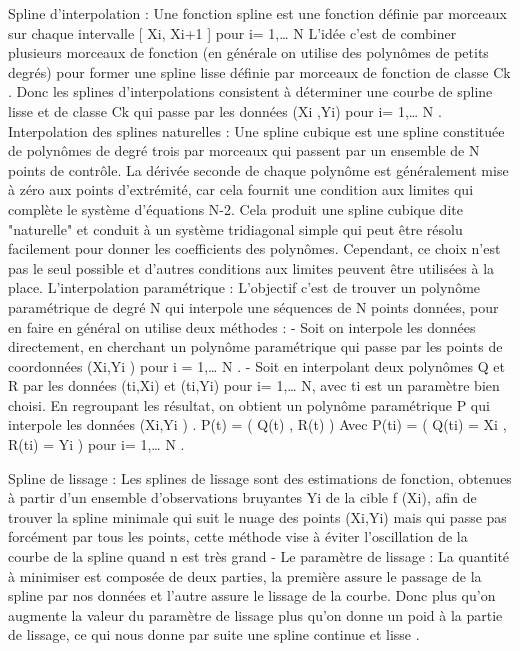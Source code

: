 \documentclass[a4paper,10pt]{article} %
\begin{document}
Spline d’interpolation :
            Une fonction spline est une fonction  définie par morceaux sur chaque intervalle          [ Xi, Xi+1 ]  pour  i= 1,… N
            L’idée c’est de combiner plusieurs morceaux de fonction (en générale on utilise des polynômes de petits degrés) pour former une spline lisse définie par morceaux de fonction de classe Ck . Donc les splines d’interpolations consistent à déterminer une courbe de spline lisse et de classe Ck qui passe par les données (Xi ,Yi)  pour  i= 1,… N .
Interpolation des splines naturelles :
            Une spline cubique est une spline constituée de polynômes de degré trois par morceaux qui passent par un ensemble de N points de contrôle. La dérivée seconde de chaque polynôme est généralement mise à zéro aux points d'extrémité, car cela fournit une condition aux limites qui complète le système d'équations N-2. Cela produit une spline cubique dite "naturelle" et conduit à un système tridiagonal simple qui peut être résolu facilement pour donner les coefficients des polynômes. Cependant, ce choix n'est pas le seul possible et d'autres conditions aux limites peuvent être utilisées à la place.
L’interpolation paramétrique :
             L'objectif  c’est de trouver un polynôme paramétrique de degré N qui interpole une séquences de N points données,  pour en faire en général on utilise deux méthodes :
-          Soit on interpole les données directement,  en cherchant un polynôme paramétrique qui passe par les points de coordonnées (Xi,Yi )   pour   i =  1,… N .
-          Soit en interpolant deux polynômes Q et R par les données (ti,Xi) et (ti,Yi) pour i= 1,… N, avec ti est un paramètre bien choisi. En regroupant les résultat, on obtient un polynôme paramétrique P qui interpole les données (Xi,Yi ) .
                P(t) = ( Q(t) , R(t) )
                         Avec      P(ti) = ( Q(ti) = Xi , R(ti) = Yi )     pour  i= 1,… N .
 
Spline de lissage :
            Les splines de lissage sont des estimations de fonction, obtenues à partir d'un ensemble d'observations bruyantes Yi de la cible f (Xi), afin de trouver la spline minimale qui suit le nuage des points (Xi,Yi) mais qui passe pas forcément par tous les points, cette méthode vise à éviter l’oscillation de la courbe de la spline quand n est très grand   
-          Le paramètre de lissage  :
            La quantité à minimiser est composée de deux parties, la première assure le passage de la spline par nos données  et l’autre assure le lissage  de la courbe. Donc plus qu’on augmente la valeur du paramètre de lissage plus qu’on donne un poid à la partie de lissage, ce qui nous donne par suite une spline continue et lisse .
 
\end{document}
